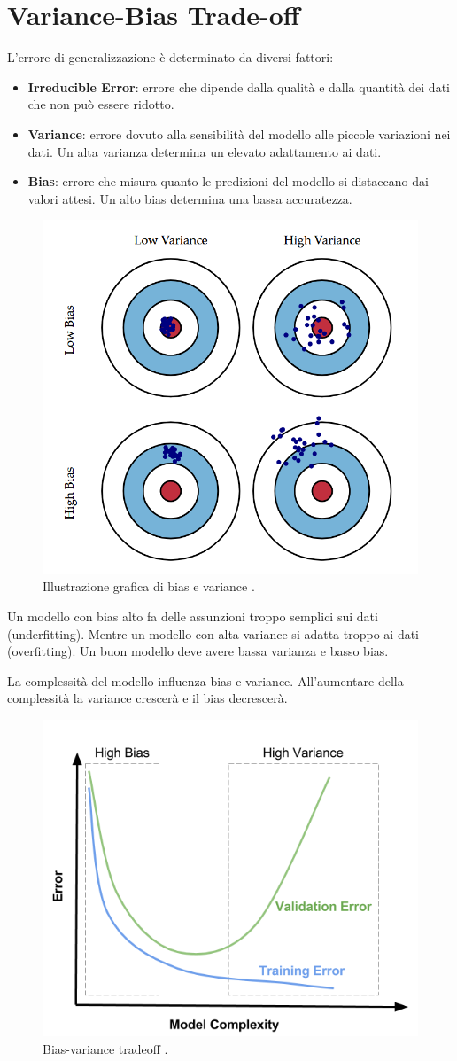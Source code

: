\chapter{Variance-Bias Trade-off}
L'errore di generalizzazione è determinato da diversi fattori:
\begin{itemize}
  \item \textbf{Irreducible Error}: errore che dipende dalla qualità e dalla quantità dei dati che non può essere ridotto.
  \item \textbf{Variance}: errore dovuto alla sensibilità del modello alle piccole variazioni nei dati.
        Un alta varianza determina un elevato adattamento ai dati.
  \item \textbf{Bias}: errore che misura quanto le predizioni del modello si distaccano dai valori attesi.
        Un alto bias determina una bassa accuratezza.
\end{itemize}

\begin{figure}[ht]
  \centering
  \includegraphics[width=0.5\linewidth]{images/bias-variance.png}
  \caption{Illustrazione grafica di bias e variance \cite{img:bias-variance}.}
\end{figure}

Un modello con bias alto fa delle assunzioni troppo semplici sui dati (underfitting).
Mentre un modello con alta variance si adatta troppo ai dati (overfitting).
Un buon modello deve avere bassa varianza e basso bias.

La complessità del modello influenza bias e variance. All'aumentare della complessità la variance crescerà e il bias decrescerà.

\begin{figure}[ht]
  \centering
  \includegraphics[width=0.6\linewidth]{images/Bias-Variance-Tradeoff-In-Machine-Learning-1.png}
  \caption{Bias-variance tradeoff \cite{img:model-complexity}.}
\end{figure}


